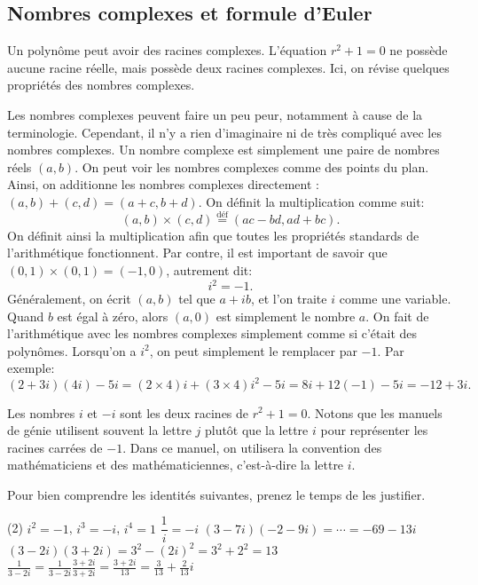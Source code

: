 \subsection{Nombres complexes et formule d'Euler}

Un polynôme peut avoir des racines complexes. 
L'équation  $r^2 + 1 = 0$ ne possède aucune racine réelle, mais possède deux racines complexes. 
Ici, on révise quelques propriétés des nombres complexes.

Les nombres complexes peuvent faire un peu peur, notamment à cause de la terminologie. 
Cependant, il n'y a rien d'imaginaire ni de très compliqué avec les nombres complexes. 
Un nombre complexe est simplement une paire de nombres réels $(a,b)$.  
On peut voir les nombres complexes comme des points du plan. 
Ainsi, on additionne les nombres complexes directement :  $(a, b)+(c, d)=(a+c, b+d)$.  On définit la multiplication  comme suit: 
\begin{equation*}
	(a, b) \times (c, d) \overset{\text{déf}}{=} (ac-bd, ad+bc) .
\end{equation*}
On définit ainsi la multiplication afin que toutes les propriétés standards de l'arithmétique fonctionnent. 
Par contre, il est important de savoir que  $(0,1) \times (0, 1) = (-1, 0)$, autrement dit:
\begin{equation*}
	i^2=-1.
\end{equation*}
Généralement, on écrit  $(a, b)$ tel que $a+ib$, et l'on traite $i$ comme une variable.  
Quand $b$ est égal à zéro, alors $(a,0)$ est simplement le nombre $a$.
On fait de l'arithmétique avec les nombres complexes simplement comme si c'était des polynômes. 
Lorsqu'on a $i^2$, on peut simplement le remplacer par  $-1$.
Par exemple: 
\begin{equation*}
	(2+3i)(4i) - 5i = (2\times 4)i + (3 \times 4) i^2 - 5i
					= 8i + 12 (-1) - 5i
					= -12 + 3i .
\end{equation*}

Les nombres $i$ et $-i$ sont les deux racines de $r^2 + 1 = 0$.
Notons que les manuels de génie utilisent souvent la lettre $j$ plutôt que la lettre $i$ pour représenter les racines carrées de $-1$. Dans ce manuel, on utilisera la convention des mathématiciens et des mathématiciennes, c'est-à-dire la lettre  $i$.

\begin{exercise}
	Pour bien comprendre les identités suivantes, prenez le temps de les justifier. 
	\begin{tasks}(2)
		\task $i^2 = -1$, $i^3 = -i$, $i^4 = 1$
		\task $\dfrac{1}{i} = -i$
		\task $(3-7i)(-2-9i) = \cdots = -69-13i$
		\task $(3-2i)(3+2i) = 3^2 - {(2i)}^2 = 3^2 + 2^2 = 13$
		\task $\frac{1}{3-2i} = \frac{1}{3-2i} \frac{3+2i}{3+2i} = \frac{3+2i}{13}
							  = \frac{3}{13}+\frac{2}{13}i$
	\end{tasks}
\end{exercise}

